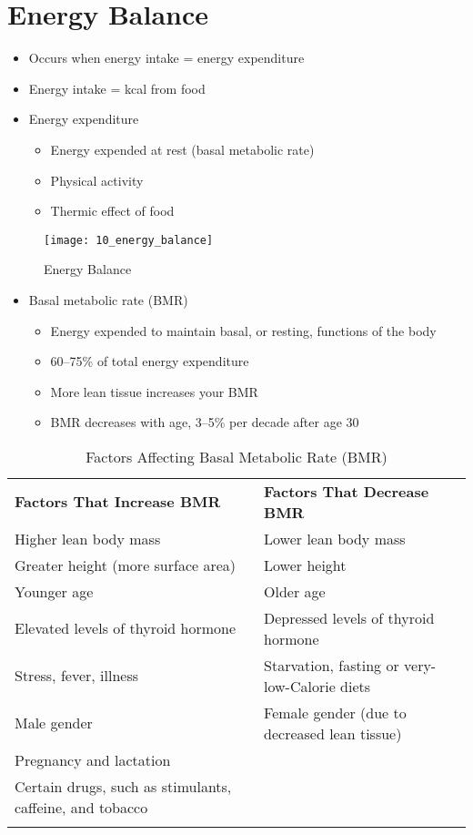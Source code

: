 \documentclass[title={Chapter 10: Achieving and Maintaining a Healthful Body Weight}]{fdsn201notes}
\begin{document}
\section{Energy Balance}\label{sec:energy-balance}
\begin{itemize}
	\item Occurs when energy intake = energy expenditure
	\item Energy intake = kcal from food
	\item Energy expenditure
	\begin{itemize}
		\item Energy expended at rest (basal metabolic rate)
		\item Physical activity
		\item Thermic effect of food
	\end{itemize}
\end{itemize}

\begin{figure}[H]
	\centering
	\texttt{[image: 10\_energy\_balance]}
	\caption{Energy Balance}
	\label{fig:energy-balance}
\end{figure}

\begin{itemize}
	\item Basal metabolic rate (BMR)
	\begin{itemize}
		\item Energy expended to maintain basal, or resting, functions of the body
		\item 60--75\% of total energy expenditure
		\item More lean tissue increases your BMR
		\item BMR decreases with age, 3--5\% per decade after age 30
	\end{itemize}
\end{itemize}

\begin{table}[H]
	\centering
	\caption{Factors Affecting Basal Metabolic Rate (BMR)}
	\label{tab:factors-affecting-bmr}
	\begin{tabular}{p{}p{}}
		\rowcolor{rowdarkgreen}\textbf{Factors That Increase BMR} & \textbf{Factors That Decrease BMR}\\
		Higher lean body mass & Lower lean body mass\\
		Greater height (more surface area) & Lower height\\
		Younger age & Older age\\
		Elevated levels of thyroid hormone & Depressed levels of thyroid hormone\\
		Stress, fever, illness & Starvation, fasting or very-low-Calorie diets\\
		Male gender & Female gender (due to decreased lean tissue)\\
		Pregnancy and lactation & \\
		Certain drugs, such as stimulants, caffeine, and tobacco & \\
		\rowcolor{rowdarkgreen} & \\
	\end{tabular}
\end{table}
\end{document}
